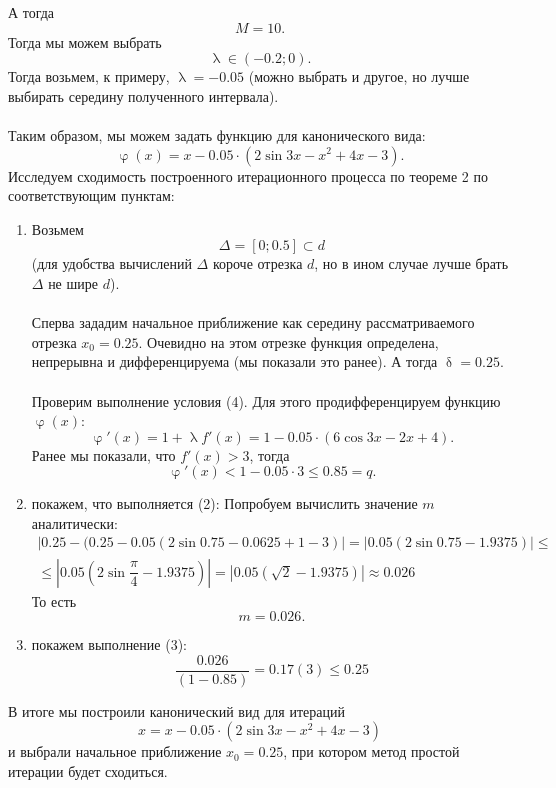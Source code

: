 \documentclass[a4paper, 12pt]{report}
\renewcommand{\leq}{\leqslant}
\renewcommand{\delta}{\updelta}
\renewcommand{\varphi}{\upvarphi}
\renewcommand{\lambda}{\uplambda}
\begin{document}
\begin{enumerate}
		А тогда $$M = 10.$$
		Тогда мы можем выбрать $$\lambda \in (-0.2; 0).$$ Тогда возьмем, к примеру, $\lambda = -0.05$ (можно выбрать и другое, но лучше выбирать середину полученного интервала).\\\\
		Таким образом, мы можем задать функцию для канонического вида: $$\varphi(x) = x - 0.05 \cdot (2\sin 3x - x^2 + 4x - 3).$$
		Исследуем сходимость построенного итерационного процесса по теореме 2 по соответствующим пунктам:
		\begin{enumerate}
			\item Возьмем $$\Delta = [0; 0.5]\subset d$$ (для удобства вычислений $\Delta$ короче отрезка $d$, но в ином случае лучше брать $\Delta$ не шире $d$).\\\\
			Сперва зададим начальное приближение как середину рассматриваемого отрезка $x_0 = 0.25$. Очевидно на этом отрезке функция определена, непрерывна и дифференцируема (мы показали это ранее). А тогда $\delta = 0.25$.\\\\
			Проверим выполнение условия (4). Для этого продифференцируем функцию $\varphi(x)$:
			$$\varphi'(x) = 1+\lambda f'(x) = 1 - 0.05 \cdot (6\cos 3x - 2x + 4).$$ Ранее мы показали, что $f'(x) > 3$, тогда $$\varphi'(x) < 1 - 0.05 \cdot 3 \leq 0.85 = q.$$
			\item покажем, что выполняется (2):
			Попробуем вычислить значение $m$ аналитически:
			\begin{multline*}
				| 0.25 - (0.25 - 0.05(2\sin0.75 - 0.0625 + 1 -3 ) | = |0.05(2\sin0.75 -1.9375)|\leq\\ \leq |0.05(2\sin\dfrac\pi4 -1.9375)|=|0.05(\sqrt2 - 1.9375)| \approx0.026
			\end{multline*}
			То есть $$m = 0.026.$$
			\item покажем выполнение (3):
			$$\dfrac{0.026}{(1-0.85)}=0.17(3) \leq 0.25$$
		\end{enumerate}
		В итоге мы построили канонический вид для итераций $$x = x - 0.05 \cdot (2\sin 3x - x^2 + 4x - 3)$$
		и выбрали начальное приближение $x_0=0.25$, при котором метод простой итерации будет сходиться.
	\end{enumerate}
\end{document}
